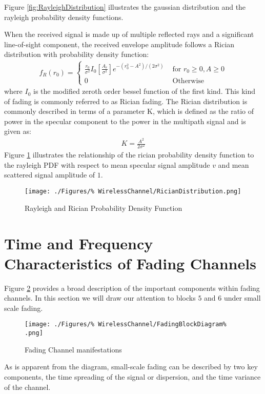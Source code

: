 Figure \ref{fig:RayleighDistribution} illustrates %
the gaussian distribution and the rayleigh %
probability density functions.

When the received signal is made up of multiple %
reflected rays and a significant line-of-sight %
component, the received envelope amplitude %
follows a Rician distribution with probability density %
function:
\begin{align}
	f_{R}(r_{0}) = \begin{cases}
		\frac{r_{0}}{\sigma^{2}}I_{0}%
		\left[ \frac{A_{r}}{\sigma^{2}} \right]%
		e^{-(r_{0}^{2}-A^{2})/(2 \sigma^{2})}%
		 & \text{ for } r_{0} \geq 0, A \geq 0\\
		0 & \text{ Otherwise}
	\end{cases}
	\label{eq:RicianPDF}
\end{align}
where $I_{0}$ is the modified zeroth order %
bessel function of the first kind. This kind of %
fading is commonly referred to as Rician fading. %
The Rician distribution is commonly described in %
terms of a parameter K\cite{Sklar01}, which is defined as %
the ratio of power in the specular component to the %
power in the multipath signal and is given as:
\begin{align}
	K = \frac{A^{2}}{2\sigma^{2}}
	\label{eq:KFactor}
\end{align}
Figure \ref{fig:RicianDistribution} illustrates the relationship %
of the rician probability density function to the rayleigh %
PDF with respect to mean specular signal amplitude $v$ and %
mean scattered signal amplitude of $1$.

\begin{figure}[ht]
	\centering
	\texttt{[image: ./Figures/\%
	WirelessChannel/RicianDistribution.png]}
	\caption{Rayleigh and Rician Probability %
	Density Function}
	\label{fig:RicianDistribution}
\end{figure}

\section{Time and Frequency Characteristics of Fading %
Channels}
\FloatBarrier

Figure \ref{fig:FadingBlocks} provides a broad %
description of the important components within %
fading channels. In this section we will draw our %
attention to blocks $5$ and $6$ under small %
scale fading.
\begin{figure}[ht]
	\centering
	\texttt{[image: ./Figures/\%
		WirelessChannel/FadingBlockDiagram\%
		.png]}
	\caption{Fading Channel manifestations%
		\cite{Sklar97-1}}
	\label{fig:FadingBlocks}
\end{figure}
As is apparent from the diagram, small-scale fading %
can be described by two key components, the time %
spreading of the signal or dispersion, and the time %
variance of the channel. 

